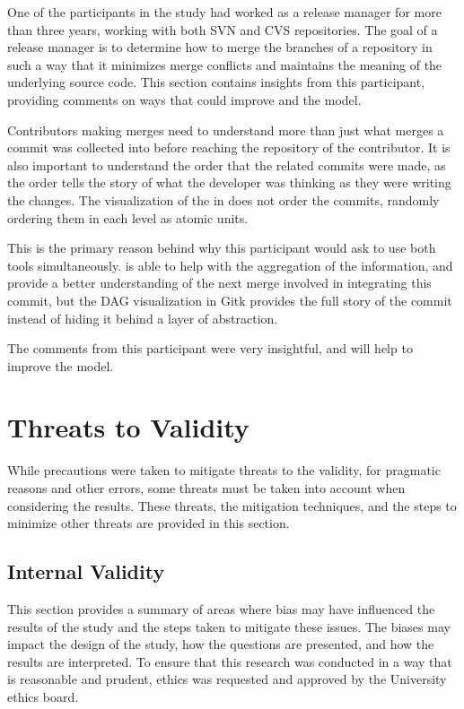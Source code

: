 One of the participants in the study had worked as a release manager for
more than three years, working with both SVN and CVS repositories. The
goal of a release manager is to determine how to merge the branches of a
repository in such a way that it minimizes merge conflicts and maintains
the meaning of the underlying source code. This section contains
insights from this participant, providing comments on ways that could
improve \tool{} and the \mt{} model.

Contributors making merges need to understand more than just what merges
a commit was collected into before reaching the repository of the
contributor.
It is also important to understand the order that the
related commits were made, as the order tells the story of what the
developer was thinking as they were writing the changes.
The visualization of the \mt{} in \tool{} does not order the commits,
randomly ordering them in each level as atomic units.

This is the primary reason behind why this participant would ask to use
both tools simultaneously. \tool{} is able to help with the aggregation
of the information, and provide a better understanding of the next merge
involved in integrating this commit, but the DAG visualization in Gitk
provides the full story of the commit instead of hiding it behind a
layer of abstraction.

The comments from this participant were very insightful, and will help
to improve the \mt{} model.

\section{Threats to Validity}\label{sec:threats_to_validity}

While precautions were taken to mitigate threats to the validity, for
pragmatic reasons and other errors, some threats must be taken into
account when considering the results. These threats, the mitigation
techniques, and the steps to minimize other threats are provided in this
section.

\subsection{Internal Validity}\label{sub:internal_validity}

This section provides a summary of areas where bias may have influenced
the results of the study and the steps taken to mitigate these issues.
The biases may impact the design of the study, how the questions are
presented, and how the results are interpreted.
To ensure that this research was conducted in a way that is reasonable
and prudent, ethics was requested and approved by the University ethics
board.

